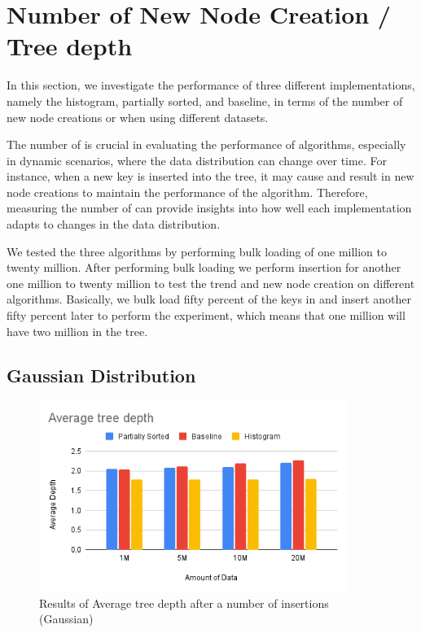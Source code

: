 \section{Number of New Node Creation / Tree depth}
In this section, we investigate the performance of three different \learnindex implementations, namely the histogram, partially sorted, and baseline, in terms of the number of new node creations or \conflict when using different datasets.

The number of \conflict is crucial in evaluating the performance of \learnindex algorithms, especially in dynamic scenarios, where the data distribution can change over time. For instance, when a new key is inserted into the tree, it may cause \conflict and result in new node creations to maintain the performance of the algorithm. Therefore, measuring the number of \conflict can provide insights into how well each \learnindex implementation adapts to changes in the data distribution.


We tested the three algorithms by performing bulk loading of one million to twenty million. After performing bulk loading we perform insertion for another one million to twenty million to test the trend and new node creation on different algorithms. Basically, we bulk load fifty percent of the keys in and insert another fifty percent later to perform the experiment, which means that one million will have two million in the tree. 


\subsection{Gaussian Distribution}
\begin{figure}[H]
    \centering
    \includegraphics[width=100mm,scale=1]{Figures/AVGTD-Gau.png}
    \caption{
     Results of Average tree depth after a number of insertions (Gaussian)
    }
    \label{fig:AverageTreeDepthGau}
\end{figure}

